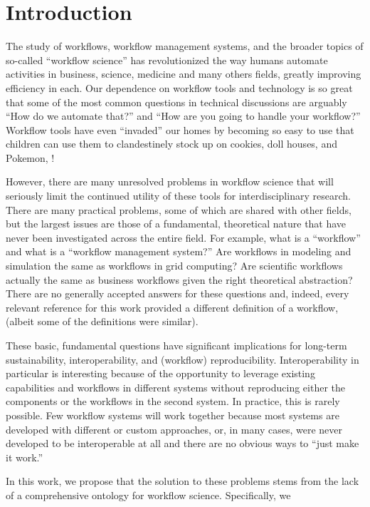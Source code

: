 \chapter{Introduction}

The study of workflows, workflow management systems, and the broader
topics of so-called ``workflow science'' has revolutionized the way
humans automate activities in business, science, medicine and many
others fields, greatly improving efficiency in each. Our dependence on
workflow tools and technology is so great that some of the most common
questions in technical discussions are arguably ``How do we automate
that?'' and ``How are you going to handle your workflow?'' Workflow
tools have even ``invaded'' our homes by becoming so easy to use that
children can use them to clandestinely stock up on cookies, doll houses,
and Pokemon, \cite{_6-year-old_2016}\cite{williams_6-year-old_2017}!

However, there are many unresolved problems in workflow science that
will seriously limit the continued utility of these tools for
interdisciplinary research. There are many practical problems, some of
which are shared with other fields, but the largest issues are those of
a fundamental, theoretical nature that have never been investigated
across the entire field. For example, what is a ``workflow'' and what is
a ``workflow management system?'' Are workflows in modeling and
simulation the same as workflows in grid computing? Are scientific
workflows actually the same as business workflows given the right
theoretical abstraction? There are no generally accepted answers for
these questions and, indeed, every relevant reference for this work
provided a different definition of a workflow, (albeit some of the
definitions were similar).

These basic, fundamental questions have significant implications for
long-term sustainability, interoperability, and (workflow)
reproducibility. Interoperability in particular is interesting because
of the opportunity to leverage existing capabilities and workflows in
different systems without reproducing either the components or the
workflows in the second system. In practice, this is rarely possible.
Few workflow systems will work together because most systems are
developed with different or custom approaches, or, in many cases, were
never developed to be interoperable at all and there are no obvious ways
to ``just make it work.''

In this work, we propose that the solution to these problems stems from
the lack of a comprehensive ontology for workflow science. Specifically,
we

